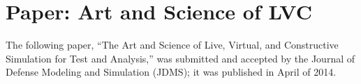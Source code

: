 \chapter{Paper: Art and Science of LVC}
\label{ch:art_and_science}

The following paper, ``The Art and Science of Live, Virtual, and Constructive Simulation for Test and Analysis,'' was submitted and accepted by the Journal of Defense Modeling and Simulation (JDMS); it was published in April of 2014. 


